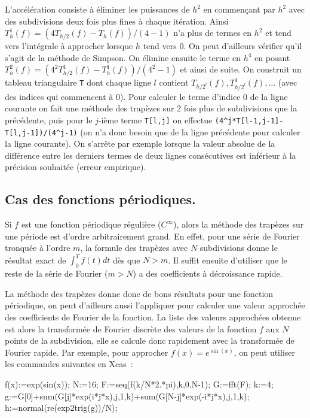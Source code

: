 \documentclass[a4paper,11pt]{article}
\begin{document}
\begin{giacjshere}
L'accélération consiste à éliminer les puissances de $h^2$ en
commençant par $h^2$ avec des subdivisions deux fois plus fines
à chaque itération.
Ainsi $T_h^1(f) = (4T_{h/2}(f)-T_h(f))/(4-1)$ n'a plus de termes en $h^2$
et tend vers l'intégrale à approcher lorsque $h$ tend vers 0. 
On peut d'ailleurs vérifier qu'il s'agit de la méthode de Simpson.
On élimine ensuite le terme en $h^4$ en posant
$T_h^2(f)=(4^2 T_{h/2}^1(f)-T_h^1(f))/(4^2-1)$ et ainsi
de suite. On construit un tableau triangulaire \verb|T|
dont chaque
ligne $l$ contient $T_{h/2^l}(f), T_{h/2^l}^1(f), ...$ 
(avec des indices qui commencent à 0). Pour
calculer le terme d'indice 0 de la ligne courante
on fait une méthode des trapèzes sur 2 fois plus
de subdivisions que la précédente, puis pour le $j$-ième terme
\verb|T[l,j]|
on effectue \verb|(4^j*T[l-1,j-1]-T[l,j-1])/(4^j-1)|
(on n'a donc besoin que de la ligne précédente pour calculer
la ligne courante).
On s'arrête par exemple lorsque la valeur absolue de la différence
entre les derniers termes de deux lignes consécutives est inférieur
à la précision souhaitée (erreur empirique).


\subsection{Cas des fonctions p\'eriodiques.}
Si $f$ est une fonction p\'eriodique r\'eguli\`ere ($C^\infty$),
alors la m\'ethode des trap\`ezes sur une p\'eriode est d'ordre 
arbitrairement grand. En effet, pour une s\'erie de Fourier tronqu\'ee
\`a l'ordre $m$, la formule des trap\`ezes avec $N$ subdivisions donne
le r\'esultat exact de $\int_0^T f(t) dt$ d\`es que $N>m$. Il suffit
ensuite d'utiliser que le reste de
la s\'erie de Fourier ($m>N$) 
a des coefficients \`a d\'ecroissance rapide.

La m\'ethode des trap\`ezes donne donc de bons r\'esultats pour une 
fonction p\'eriodique, on peut d'ailleurs aussi 
l'appliquer pour calculer une valeur
approch\'ee des coefficients de Fourier de la fonction. La liste des valeurs
approch\'ees obtenue est alors la transform\'ee de Fourier discr\`ete
des valeurs de la fonction $f$ aux $N$ points de la subdivision, elle
se calcule donc rapidement avec la transform\'ee de Fourier rapide.
Par exemple, pour approcher $f(x)=e^{\sin(x)}$, on peut utiliser les
commandes suivantes en Xcas~:
\begin{giacprog}
f(x):=exp(sin(x));
N:=16; F:=seq(f(k/N*2.*pi),k,0,N-1); G:=fft(F);
k:=4;
g:=G[0]+sum(G[j]*exp(i*j*x),j,1,k)+sum(G[N-j]*exp(-i*j*x),j,1,k);
h:=normal(re(exp2trig(g))/N);
\end{giacprog}


\end{giacjshere}
\end{document}
